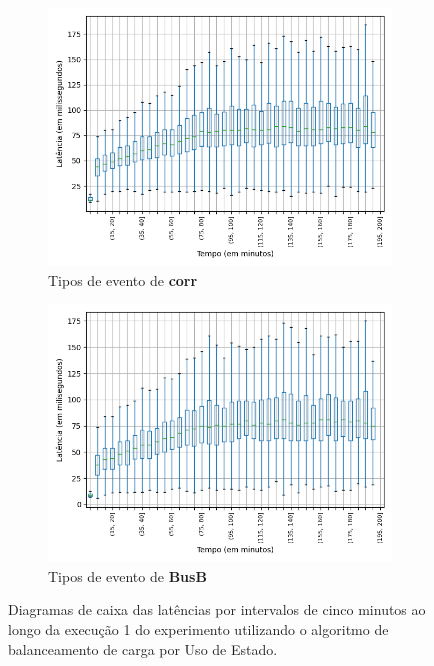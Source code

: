 \begin{figure}
\begin{subfigure}{.5\textwidth}
\centering
\includegraphics[width=\textwidth]{figuras/graphics/boxplot_5-dez-su_corr.png}
\caption{Tipos de evento de \textbf{corr}}
\label{fig:BoxPlot_corr_SU_1}
\end{subfigure}%
\begin{subfigure}{.5\textwidth}
\centering
\includegraphics[width=\textwidth]{figuras/graphics/boxplot_5-dez-su_busb.png}
\caption{Tipos de evento de \textbf{BusB} }
\label{fig:BoxPlot_BusB_SU_1}
\end{subfigure}%
\caption{Diagramas de caixa das latências por intervalos de cinco minutos ao longo da execução 1 do experimento utilizando o algoritmo de balanceamento de carga por Uso de Estado.}
\end{figure}






